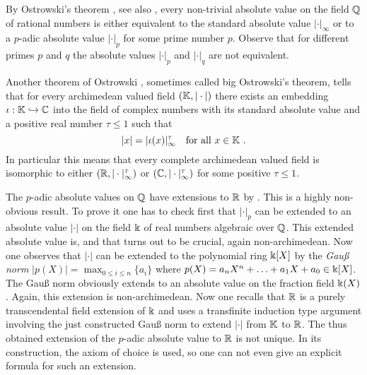 \begin{remarks}
  \begin{environmentlist}
  \item
    By  Ostrowski's theorem \cite[p.~276]{OstLF}, see also \cite[Thm.~3.1.3]{GouAN}, every non-trivial absolute value
    on the field $\mathbb{Q}$ of rational numbers is either equivalent to the standard absolute value $|\cdot|_\infty$ or to a
    $p$-adic absolute value $|\cdot|_p$  for some prime number $p$. Observe that for different primes $p$ and $q$ the
    absolute values $|\cdot|_p$ and $|\cdot|_q$ are not equivalent.
  \item
    Another theorem of Ostrowski \cite[p.~284]{OstLF}, sometimes called big Ostrowski's theorem, tells that for every archimedean
    valued field $(\mathbb{K},|\cdot|)$ there exists an embedding $\iota :\mathbb{K} \hookrightarrow \mathbb{C}$ into the field of complex numbers
    with its standard absolute value and a positive real number $\tau\leq 1$ such that
    \[
         |x| =|\iota(x) |_\infty^\tau \quad \text{for all } x \in \mathbb{K} \ .
    \]
    In particular this means that every complete archimedean valued field is isomorphic to either $(\mathbb{R},|\cdot|_\infty^\tau)$ or
    $(\mathbb{C},|\cdot|_\infty^\tau)$ for some positive $\tau\leq 1$.
  \item
    The $p$-adic absolute values on $\mathbb{Q}$  have extensions to $\mathbb{R}$ by \cite[XII, \S4, Thm.~4.1]{LanA3rd}. 
    This is a highly non-obvious result. To prove it one has to check first that $|\cdot|_p$ can be extended to an absolute 
    value $|\cdot|$ on the field $\Bbbk$ of real numbers algebraic over $\mathbb{Q}$. This extended absolute value is, 
    and that turns out to be crucial, again non-archimedean. 
    Now one observes that $|\cdot|$ can be extended to the polynomial ring $\Bbbk [X]$ by the \emph{Gau{\ss} norm}
    $|p(X)| = \max_{0\leq i \leq n} \{a_i\}$ where $p(X)= a_n X^n + \ldots + a_1 X + a_0 \in\Bbbk [X]$.
    The Gau{\ss} norm obviously extends to an absolute value on the fraction field $\Bbbk(X)$.
    Again, this extension is non-archimedean. 
    Now one recalls that $\mathbb{R}$ is a purely transcendental field extension of $\Bbbk$ and uses a transfinite induction type
    argument involving the just constructed  Gau{\ss} norm to extend $|\cdot|$ from $\mathbb{K}$ to $\mathbb{R}$.
    The thus obtained extension of the $p$-adic absolute value to $\mathbb{R}$ is not unique. In its construction, the
    axiom of choice is used, so one can not even give an explicit formula for such an extension. 
  \end{environmentlist}
\end{remarks}
